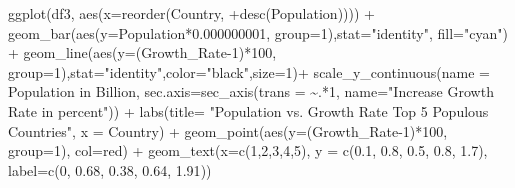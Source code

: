 \documentclass[
]{article}
\newenvironment{Shaded}{\begin{snugshade}}{\end{snugshade}}
\newcommand{\AttributeTok}[1]{\textcolor[rgb]{0.77,0.63,0.00}{#1}}
\newcommand{\DecValTok}[1]{\textcolor[rgb]{0.00,0.00,0.81}{#1}}
\newcommand{\FloatTok}[1]{\textcolor[rgb]{0.00,0.00,0.81}{#1}}
\newcommand{\FunctionTok}[1]{\textcolor[rgb]{0.00,0.00,0.00}{#1}}
\newcommand{\NormalTok}[1]{#1}
\newcommand{\SpecialCharTok}[1]{\textcolor[rgb]{0.00,0.00,0.00}{#1}}
\newcommand{\StringTok}[1]{\textcolor[rgb]{0.31,0.60,0.02}{#1}}
\begin{document}
\begin{Shaded}
\begin{Highlighting}[]
\FunctionTok{ggplot}\NormalTok{(df3, }\FunctionTok{aes}\NormalTok{(}\AttributeTok{x=}\FunctionTok{reorder}\NormalTok{(Country, }\SpecialCharTok{+}\FunctionTok{desc}\NormalTok{(Population))))  }\SpecialCharTok{+} 
  \FunctionTok{geom\_bar}\NormalTok{(}\FunctionTok{aes}\NormalTok{(}\AttributeTok{y=}\NormalTok{Population}\SpecialCharTok{*}\FloatTok{0.000000001}\NormalTok{, }\AttributeTok{group=}\DecValTok{1}\NormalTok{),}\AttributeTok{stat=}\StringTok{"identity"}\NormalTok{, }\AttributeTok{fill=}\StringTok{"cyan"}\NormalTok{) }\SpecialCharTok{+}
  \FunctionTok{geom\_line}\NormalTok{(}\FunctionTok{aes}\NormalTok{(}\AttributeTok{y=}\NormalTok{(Growth\_Rate}\DecValTok{{-}1}\NormalTok{)}\SpecialCharTok{*}\DecValTok{100}\NormalTok{, }\AttributeTok{group=}\DecValTok{1}\NormalTok{),}\AttributeTok{stat=}\StringTok{"identity"}\NormalTok{,}\AttributeTok{color=}\StringTok{"black"}\NormalTok{,}\AttributeTok{size=}\DecValTok{1}\NormalTok{)}\SpecialCharTok{+}
  \FunctionTok{scale\_y\_continuous}\NormalTok{(}\AttributeTok{name =} \StringTok{\textquotesingle{}Population in Billion\textquotesingle{}}\NormalTok{, }\AttributeTok{sec.axis=}\FunctionTok{sec\_axis}\NormalTok{(}\AttributeTok{trans =} \SpecialCharTok{\textasciitilde{}}\NormalTok{.}\SpecialCharTok{*}\DecValTok{1}\NormalTok{, }\AttributeTok{name=}\StringTok{"Increase Growth Rate in percent"}\NormalTok{)) }\SpecialCharTok{+}
  \FunctionTok{labs}\NormalTok{(}\AttributeTok{title=} \StringTok{"Population vs. Growth Rate Top 5 Populous Countries"}\NormalTok{, }\AttributeTok{x =} \StringTok{\textquotesingle{}Country\textquotesingle{}}\NormalTok{) }\SpecialCharTok{+}
  \FunctionTok{geom\_point}\NormalTok{(}\FunctionTok{aes}\NormalTok{(}\AttributeTok{y=}\NormalTok{(Growth\_Rate}\DecValTok{{-}1}\NormalTok{)}\SpecialCharTok{*}\DecValTok{100}\NormalTok{, }\AttributeTok{group=}\DecValTok{1}\NormalTok{), }\AttributeTok{col=}\StringTok{\textquotesingle{}red\textquotesingle{}}\NormalTok{) }\SpecialCharTok{+}
  \FunctionTok{geom\_text}\NormalTok{(}\AttributeTok{x=}\FunctionTok{c}\NormalTok{(}\DecValTok{1}\NormalTok{,}\DecValTok{2}\NormalTok{,}\DecValTok{3}\NormalTok{,}\DecValTok{4}\NormalTok{,}\DecValTok{5}\NormalTok{), }\AttributeTok{y =} \FunctionTok{c}\NormalTok{(}\FloatTok{0.1}\NormalTok{, }\FloatTok{0.8}\NormalTok{, }\FloatTok{0.5}\NormalTok{, }\FloatTok{0.8}\NormalTok{, }\FloatTok{1.7}\NormalTok{), }\AttributeTok{label=}\FunctionTok{c}\NormalTok{(}\DecValTok{0}\NormalTok{, }\FloatTok{0.68}\NormalTok{, }\FloatTok{0.38}\NormalTok{, }\FloatTok{0.64}\NormalTok{, }\FloatTok{1.91}\NormalTok{))}
\end{Highlighting}
\end{Shaded}
\end{document}
